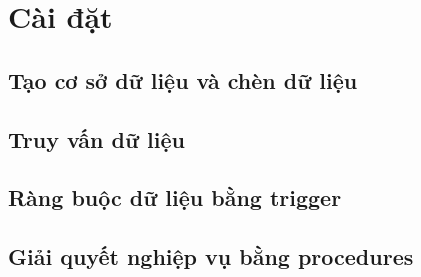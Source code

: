 \documentclass[a4paper, 12pt]{report}
\begin{document}
\chapter{Cài đặt}

\section{Tạo cơ sở dữ liệu và chèn dữ liệu}



\section{Truy vấn dữ liệu}



\section{Ràng buộc dữ liệu bằng trigger}

\section{Giải quyết nghiệp vụ bằng procedures}
\end{document}
